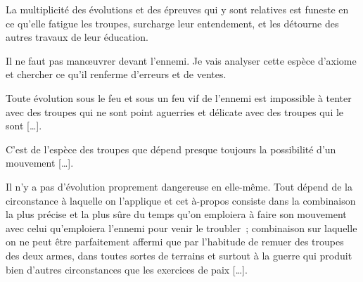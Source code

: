 \documentclass[french,twoside]{book} %
\begin{document}
La multiplicité des évolutions et des épreuves qui y sont relatives est funeste en ce qu’elle fatigue les troupes, surcharge leur entendement, et les détourne des autres travaux de leur éducation.\par
Il ne faut pas manœuvrer devant l’ennemi. Je vais analyser cette espèce d’axiome et chercher ce qu’il renferme d’erreurs et de ventes.\par
Toute évolution sous le feu et sous un feu vif de l’ennemi est impossible à tenter avec des troupes qui ne sont point aguerries et délicate avec des troupes qui le sont […].\par
C’est de l’espèce des troupes que dépend presque toujours la possibilité d’un mouvement […].\par
Il n’y a pas d’évolution proprement dangereuse en elle-même. Tout dépend de la circonstance à laquelle on l’applique et cet à-propos consiste dans la combinaison la plus précise et la plus sûre du temps qu’on emploiera à faire son mouvement avec celui qu’emploiera l’ennemi pour venir le troubler ; combinaison sur laquelle on ne peut être parfaitement affermi que par l’habitude de remuer des troupes des deux armes, dans toutes sortes de terrains et surtout à la guerre qui produit bien d’autres circonstances que les exercices de paix […].
\end{document}
